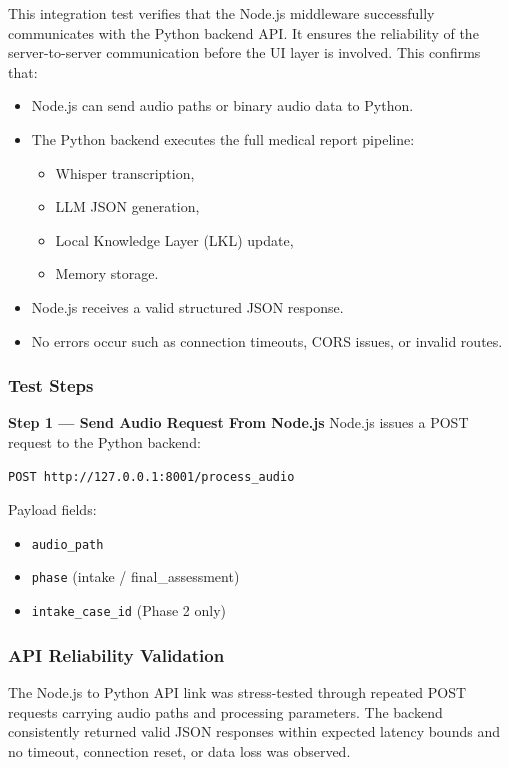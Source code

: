 This integration test verifies that the Node.js middleware successfully communicates with the Python backend API.  
It ensures the reliability of the server-to-server communication before the UI layer is involved. This confirms that:

\begin{itemize}
    \item Node.js can send audio paths or binary audio data to Python.
    \item The Python backend executes the full medical report pipeline:
    \begin{itemize}
        \item Whisper transcription,
        \item LLM JSON generation,
        \item Local Knowledge Layer (LKL) update,
        \item Memory storage.
    \end{itemize}
    \item Node.js receives a valid structured JSON response.
    \item No errors occur such as connection timeouts, CORS issues, or invalid routes.
\end{itemize}

\subsubsection*{Test Steps}

\textbf{Step 1 — Send Audio Request From Node.js}  
Node.js issues a POST request to the Python backend:

\begin{verbatim}
POST http://127.0.0.1:8001/process_audio
\end{verbatim}

Payload fields:
\begin{itemize}
    \item \texttt{audio\_path}
    \item \texttt{phase} (intake / final\_assessment)
    \item \texttt{intake\_case\_id} (Phase 2 only)
\end{itemize}
\subsubsection*{API Reliability Validation}

The Node.js to Python API link was stress-tested through repeated POST requests carrying audio paths and processing parameters. The backend consistently returned valid JSON responses within expected latency bounds and no timeout, connection reset, or data loss was observed.

